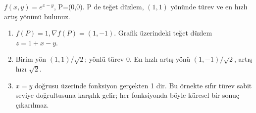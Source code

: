 \begin{tcolorbox}[title={Örnek 6.13 | Birleşik pekiştirme},colframe=accent]\(f(x,y)=e^{x-y}\), P=(0,0). P de teğet düzlem, \((1,1)\) yönünde türev ve en hızlı artış yönünü bulunuz.
\par\vspace{1mm}{\scriptsize\sffamily Pekiştirme}\end{tcolorbox}
\begin{tcolorbox}[title={Adım adım çözüm},colback=green!3!white,colframe=green]\begin{enumerate}
\item \(f(P)=1,\nabla f(P)=(1,-1)\). Grafik üzerindeki teğet düzlem \(z=1+x-y\).
\item Birim yön \((1,1)/\sqrt2\); yönlü türev 0. En hızlı artış yönü \((1,-1)/\sqrt2\), artış hızı \(\sqrt2\).
\item \(x=y\) doğrusu üzerinde fonksiyon gerçekten 1 dir. Bu örnekte sıfır türev sabit seviye doğrultusuna karşılık gelir; her fonksiyonda böyle küresel bir sonuç çıkarılmaz.
\end{enumerate}\end{tcolorbox}

\clearpage
